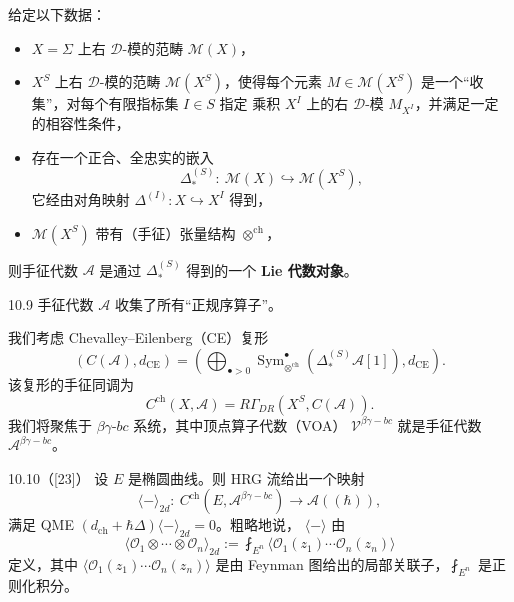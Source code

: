 给定以下数据：
\begin{itemize}[leftmargin=1.6em,itemsep=0.2em]
  \item $X=\Sigma$ 上右 $\mathcal{D}$-模的范畴 $\mathcal{M}(X)$，
  \item $X^S$ 上右 $\mathcal{D}$-模的范畴 $\mathcal{M}(X^S)$，使得每个元素
        $M\in\mathcal{M}(X^S)$ 是一个“收集”，对每个有限指标集 $I\in S$ 指定
        乘积 $X^I$ 上的右 $\mathcal{D}$-模 $M_{X^I}$，并满足一定的相容性条件，
  \item 存在一个正合、全忠实的嵌入
        \[
          \Delta_*^{(S)}:\ \mathcal{M}(X)\hookrightarrow\mathcal{M}(X^S),
        \]
        它经由对角映射 $\Delta^{(I)}:X\hookrightarrow X^I$ 得到，
  \item $\mathcal{M}(X^S)$ 带有（手征）张量结构 $\otimes^{\mathrm{ch}}$，
\end{itemize}
则手征代数 $\mathcal{A}$ 是通过 $\Delta_*^{(S)}$ 得到的一个 \textbf{Lie 代数对象}。

\begin{wrem}{10.9}
  手征代数 $\mathcal{A}$ 收集了所有“正规序算子”。
\end{wrem}


我们考虑 Chevalley--Eilenberg（CE）复形
\[
  (C(\mathcal{A}),d_{\mathrm{CE}})
  =\left(\bigoplus_{\bullet>0}\operatorname{Sym}^\bullet_{\otimes^{\mathrm{ch}}}
  \left(\Delta_*^{(S)}\mathcal{A}[1]\right),d_{\mathrm{CE}}\right).
\]
该复形的手征同调为
\[
  C^{\mathrm{ch}}(X,\mathcal{A})=R\Gamma_{DR}(X^S,C(\mathcal{A})).
\]
我们将聚焦于 $\beta\gamma$-$bc$ 系统，其中顶点算子代数（VOA）
$\mathcal{V}^{\beta\gamma-bc}$ 就是手征代数 $\mathcal{A}^{\beta\gamma-bc}$。

\begin{wthm}{10.10（[23]）}
  设 $E$ 是椭圆曲线。则 HRG 流给出一个映射
  \[
    \langle-\rangle_{2d}:\ C^{\mathrm{ch}}
    (E,\mathcal{A}^{\beta\gamma-bc})\longrightarrow\mathcal{A}((\hbar)),
  \]
  满足 QME $(d_{\mathrm{ch}}+\hbar\Delta)\langle-\rangle_{2d}=0$。粗略地说，
  $\langle-\rangle$ 由
  \[
    \langle\mathcal{O}_1\otimes\cdots\otimes\mathcal{O}_n\rangle_{2d}
    :=\fint_{E^n}\langle\mathcal{O}_1(z_1)\cdots\mathcal{O}_n(z_n)\rangle
  \]
  定义，其中 $\langle\mathcal{O}_1(z_1)\cdots\mathcal{O}_n(z_n)\rangle$ 是由
  Feynman 图给出的局部关联子，$\fint_{E^n}$ 是正则化积分。
\end{wthm}


